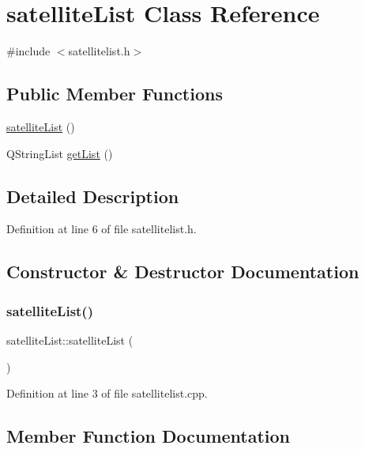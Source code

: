 \hypertarget{classsatelliteList}{}\section{satellite\+List Class Reference}
\label{classsatelliteList}


{\ttfamily \#include $<$satellitelist.\+h$>$}

\subsection*{Public Member Functions}
\begin{DoxyCompactItemize}
\item 
\hyperlink{classsatelliteList_a6af9afd5b010413ef586f1da40d80d32}{satellite\+List} ()
\item 
Q\+String\+List \hyperlink{classsatelliteList_a2215d781cddc14cf9290c57c9b32a60e}{get\+List} ()
\end{DoxyCompactItemize}


\subsection{Detailed Description}


Definition at line 6 of file satellitelist.\+h.



\subsection{Constructor \& Destructor Documentation}
\mbox{\label{classsatelliteList_a6af9afd5b010413ef586f1da40d80d32}} 
\subsubsection{\texorpdfstring{satellite\+List()}{satelliteList()}}
{\footnotesize\ttfamily satellite\+List\+::satellite\+List (\begin{DoxyParamCaption}{ }\end{DoxyParamCaption})}



Definition at line 3 of file satellitelist.\+cpp.



\subsection{Member Function Documentation}
\mbox{\label{classsatelliteList_a2215d781cddc14cf9290c57c9b32a60e}} 
